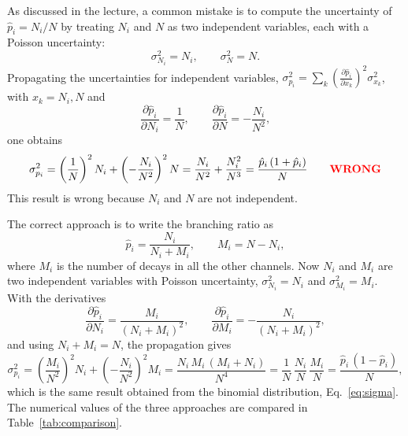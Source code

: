\documentclass[11pt,a4paper]{article}
\begin{document}
	As discussed in the lecture, a common mistake is to compute the uncertainty of $\hat{p}_i = N_i/N$ by treating $N_i$ and $N$ as two independent variables, each with a Poisson uncertainty:
	\begin{equation}
		\sigma^2_{N_i} = N_i, \qquad \sigma^2_{N} = N .
	\end{equation}
	Propagating the uncertainties for independent variables, $\sigma^2_{p_i} = \sum_k \left(\frac{\partial \hat{p}_i}{\partial x_k}\right)^2 \sigma_{x_k}^2$, with $x_k = N_i, N$ and
	\begin{equation}
		\frac{\partial \hat{p}_i}{\partial N_i} = \frac{1}{N}, \qquad \frac{\partial \hat{p}_i}{\partial N} = -\frac{N_i}{N^2},
	\end{equation}
	one obtains
	\begin{equation}
		\sigma^2_{p_i} = \left(\frac{1}{N}\right)^2 N_i + \left(-\frac{N_i}{N^2}\right)^2 N
		= \frac{N_i}{N^2} + \frac{N_i^2}{N^3}
		= \frac{\hat{p}_i\,(1+\hat{p}_i)}{N} \qquad \textbf{\color{red}WRONG}
	\end{equation}
	This result is wrong because $N_i$ and $N$ are not independent.
	
	The correct approach is to write the branching ratio as
	\begin{equation}
		\hat{p}_i = \frac{N_i}{N_i + M_i}, \qquad M_i = N - N_i ,
	\end{equation}
	where $M_i$ is the number of decays in all the other channels.
	Now $N_i$ and $M_i$ are two independent variables with Poisson uncertainty, $\sigma^2_{N_i} = N_i$ and $\sigma^2_{M_i} = M_i$.
	With the derivatives
	\begin{equation}
		\frac{\partial \hat{p}_i}{\partial N_i} = \frac{M_i}{(N_i + M_i)^2}, \qquad \frac{\partial \hat{p}_i}{\partial M_i} = -\frac{N_i}{(N_i + M_i)^2},
	\end{equation}
	and using $N_i + M_i = N$, the propagation gives
	\begin{equation}
		\sigma^2_{p_i} = \left(\frac{M_i}{N^2}\right)^2 N_i + \left(-\frac{N_i}{N^2}\right)^2 M_i
		= \frac{N_i\, M_i\,(M_i + N_i)}{N^4}
		= \frac{1}{N}\,\frac{N_i}{N}\,\frac{M_i}{N}
		= \frac{\hat{p}_i\,(1-\hat{p}_i)}{N},
	\end{equation}
	which is the same result obtained from the binomial distribution, Eq.~\eqref{eq:sigma}.
	The numerical values of the three approaches are compared in Table~\ref{tab:comparison}.
	
\end{document}
